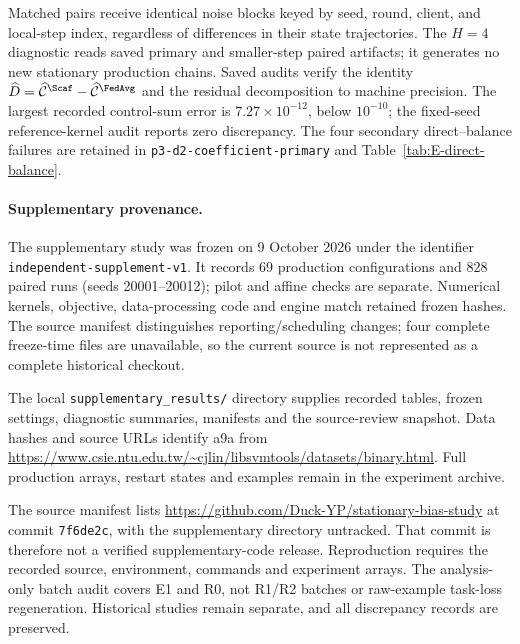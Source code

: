Matched pairs receive identical noise blocks keyed by seed, round, client,
and local-step index, regardless of differences in their state trajectories.
The $H=4$ diagnostic reads saved primary and smaller-step paired artifacts;
it generates no new stationary production chains.
Saved audits verify the identity
$\widehat D=\widehat{\mathcal C}^{\Scaf}-\widehat{\mathcal C}^{\FedAvg}$
and the residual decomposition to machine precision.
The largest recorded control-sum error is $7.27\times10^{-12}$,
below $10^{-10}$; the fixed-seed reference-kernel audit reports zero discrepancy.
The four secondary direct--balance failures are retained in
\texttt{p3-d2-coefficient-primary} and Table~\ref{tab:E-direct-balance}.

\paragraph{Supplementary provenance.}
The supplementary study was frozen on 9 October 2026 under the identifier \nolinkurl{independent-supplement-v1}. It records 69 production configurations and 828 paired runs (seeds 20001--20012); pilot and affine checks are separate. Numerical kernels, objective, data-processing code and engine match retained frozen hashes. The source manifest distinguishes reporting/scheduling changes; four complete freeze-time files are unavailable, so the current source is not represented as a complete historical checkout.

The local \nolinkurl{supplementary_results/} directory supplies recorded tables, frozen settings, diagnostic summaries, manifests and the source-review snapshot. Data hashes and source URLs identify a9a from \url{https://www.csie.ntu.edu.tw/~cjlin/libsvmtools/datasets/binary.html}. Full production arrays, restart states and examples remain in the experiment archive.

The source manifest lists \url{https://github.com/Duck-YP/stationary-bias-study} at commit \texttt{7f6de2c}, with the supplementary directory untracked. That commit is therefore not a verified supplementary-code release. Reproduction requires the recorded source, environment, commands and experiment arrays. The analysis-only batch audit covers E1 and R0, not R1/R2 batches or raw-example task-loss regeneration. Historical studies remain separate, and all discrepancy records are preserved.
